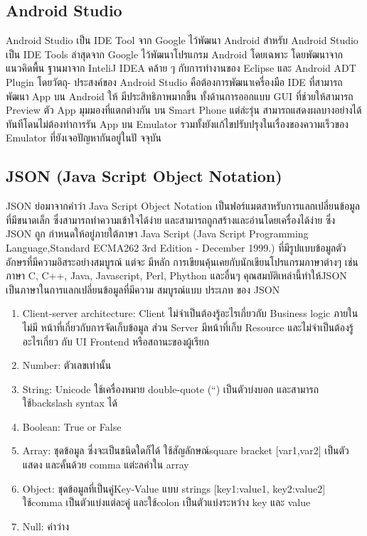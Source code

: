 \subsection{Android Studio}
\quad \quad Android Studio \cite{android_studio} เป็น IDE Tool จาก Google ไว้พัฒนา Android สําหรับ Android Studio
เป็น IDE Tools ล่าสุดจาก Google ไว้พัฒนาโปรแกรม Android โดยเฉพาะ โดยพัฒนาจากแนวคิดพื้น
ฐานมาจาก InteliJ IDEA คล้าย ๆ กับการทํางานของ Eclipse และ Android ADT Plugin โดยวัตถุ-
ประสงค์ของ Android Studio คือต้องการพัฒนาเครื่องมือ IDE ที่สามารถพัฒนา App บน Android ให้
มีประสิทธิภาพมากขึ้น ทั้งด้านการออกแบบ GUI ที่ช่วยให้สามารถ Preview ตัว App มุมมองที่แตกต่างกัน
บน Smart Phone แต่ล่ะรุ่น สามารถแสดงผลบางอย่างได้ทันทีโดนไม่ต้องทําการรัน App บน Emulator
รวมทั้งยังแก้ไขปรับปรุงในเรื่องของความเร็วของ Emulator ที่ยังเจอปัญหากันอยู่ในปั จจุบัน

\subsection{JSON (Java Script Object Notation)}
\quad \quad JSON \cite{json} ย่อมาจากคําว่า Java Script Object Notation เป็นฟอร์แมตสาหรับการแลกเปลี่ยนข้อมูล
ที่มีขนาดเล็ก ซึ่งสามารถทําความเข้าใจได้ง่าย และสามารถถูกสร้างและอ่านโดยเครื่องได้ง่าย ซึ่ง JSON ถูก
กําหนดให้อยู่ภายใต้ภาษา Java Script (Java Script Programming Language,Standard ECMA262
3rd Edition - December 1999.) ที่มีรูปแบบข้อมูลตัวอักษรที่มีความอิสระอย่างสมบูรณ์ แต่จะ มีหลัก
การเขียนคุ้นเคยกับนักเขียนโปรแกรมภาษาต่างๆ เช่น ภาษา C, C++, Java, Javascript, Perl, Phython
และอื่นๆ คุณสมบัติเหล่านี้ทําให้JSON เป็นภาษาในการแลกเปลี่ยนข้อมูลที่มีความ สมบูรณ์แบบ ประเภท
ของ JSON
\begin{enumerate}
  \item  Client-server architecture: Client ไม่จําเป็นต้องรู้อะไรเกี่ยวกับ Business logic ภายใน ไม่มี
  หน้าที่เกี่ยวกับการจัดเก็บข้อมูล ส่วน Server มีหน้าที่เก็บ Resource และไม่จําเป็นต้องรู้อะไรเกี่ยว
  กับ UI Frontend หรือสถานะของผู้เรียก
  

  \item  Number: ตัวเลขเท่านั้น
  
  \item String: Unicode ใช้เครื่องหมาย double-quote (“) เป็นตัวบ่งบอก และสามารถใช้backslash
  syntax ได้
  
  \item Boolean: True or False
  \item    Array: ชุดข้อมูล ซึ่งจะเป็นชนิดใดก็ได้ ใช้สัญลักษณ์square bracket [var1,var2] เป็นตัวแสดง
  และคั้นด้วย comma แต่ะลค่าใน array
  \item  Object: ชุดข้อมูลที่เป็นคู่Key-Value แบบ strings [key1:value1, key2:value2] ใช้comma
  เป็นตัวแบ่งแต่ละคู่ และใช้colon เป็นตัวแบ่งระหว่าง key และ value
  \item    Null: ค่าว่าง
\end{enumerate}

